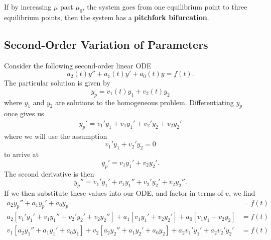 \documentclass{article}
\begin{document}
If by increasing \(\mu\) past \(\mu_0\), the system goes from one equilibrium point to three equilibrium points,
then the system has a \textbf{pitchfork bifurcation}.
\newpage
\begin{appendix}
    \section{Second-Order Variation of Parameters}
    Consider the following second-order linear ODE
    \begin{equation*}
        a_2\left( t \right) y'' + a_1\left( t \right) y' + a_0\left( t \right) y = f\left( t \right).
    \end{equation*}
    The particular solution is given by
    \begin{equation*}
        y_p = v_1 \left( t \right) y_1 + v_2\left( t \right) y_2
    \end{equation*}
    where \(y_1\) and \(y_2\) are solutions to the homogeneous problem.
    Differentiating \(y_p\) once gives us
    \begin{align*}
        y_p' = v_1' y_1 + v_1 y_1' + v_2' y_2 + v_2 y_2'
    \end{align*}
    where we will use the assumption
    \begin{equation*}
        v_1' y_1 + v_2' y_2 = 0
    \end{equation*}
    to arrive at
    \begin{equation*}
        y_p' = v_1 y_1' + v_2 y_2'.
    \end{equation*}
    The second derivative is then
    \begin{equation*}
        y_p'' = v_1' y_1' + v_1 y_1'' + v_2' y_2' + v_2 y_2''.
    \end{equation*}
    If we then substitute these values into our ODE, and factor in terms of \(v\), we find
    \begin{align*}
        a_2 y_p'' + a_1 y_p' + a_0 y_p                                                                                                                   & = f\left( t \right) \\
        a_2 \left[ v_1' y_1' + v_1 y_1'' + v_2' y_2' + v_2 y_2'' \right] + a_1 \left[ v_1 y_1' + v_2 y_2' \right] + a_0 \left[ v_1 y_1 + v_2 y_2 \right] & = f\left( t \right) \\
        v_1 \left[ a_2 y_1'' + a_1 y_1' + a_0 y_1 \right] + v_2 \left[ a_2 y_2'' + a_1 y_2' + a_0 y_2 \right] + a_2 v_1' y_1' + a_2 v_2' y_2'            & = f\left( t \right) \\

\end{align*}
\end{appendix}
\end{document}
